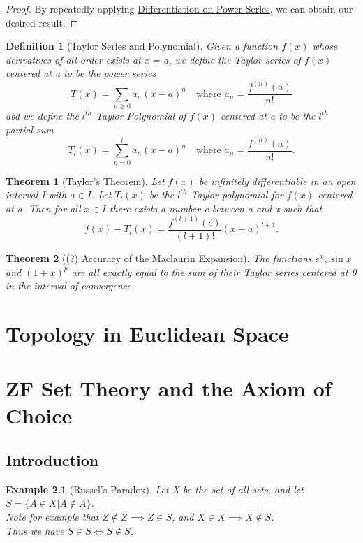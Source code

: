 \documentclass[11pt, oneside]{book}
\theoremstyle{break}
\newtheorem{thm}{Theorem}[section]
\newtheorem*{proof}{Proof}
\newtheorem{defn}{Definition}[section]
\newtheorem{eg}{Example}[section]
\begin{document}
\begin{proof}
	By repeatedly applying \hyperref[power_series_differentiation]{Differentiation on Power Series}, we can obtain our desired result.
\end{proof}

\begin{defn}[Taylor Series and Polynomial]
	Given a function $f(x)$ whose derivatives of all order exists at x = a, we define the Taylor series of $f(x)$ centered at a to be the power series
	\[
		T(x) = \sum_{n \geq 0} a_n (x-a)^n \quad \text{where } a_n = \frac{f^{(n)}(a)}{n!} 
	\]
	abd we define the $l^{th}$ Taylor Polynomial of $f(x)$ centered at a to be the $l^{th}$ partial sum
	\[
		T_l(x) = \sum_{n=0}^{l} a_n (x-a)^n \quad \text{where } a_n = \frac{f^{(n)}(a)}{n!}.
	\]
\end{defn}

\begin{thm}[Taylor's Theorem]
	Let $f(x)$ be infinitely differentiable in an open interval I with $a \in I$. Let $T_l(x)$ be the $l^{th}$ Taylor polynomial for $f(x)$ centered at a. Then for all $x \in I$ there exists a number c between a and x such that
	\[
		f(x) - T_l(x) = \frac{f^{(l + 1)}(c)}{(l + 1)!} (x-a)^{l+1}. 
	\]
\end{thm}

\begin{thm}[(?) Accuracy of the Maclaurin Expansion]
	The functions $e^x, \sin x$ and $(1+x)^p$ are all exactly equal to the sum of their Taylor series centered at 0 in the interval of convergence.
\end{thm}

\chapter{Topology in Euclidean Space}


\appendix

\chapter{ZF Set Theory and the Axiom of Choice}\label{apdxA}
\section{Introduction}
\begin{eg}[Russel's Paradox]\label{russel_paradox}
	Let X be the set of all sets, and let $S = \{ A \in X | A \notin A\}$.\\
	Note for example that $Z \notin Z \implies Z \in S$, and $X \in X \implies X \notin S$.\\
	Thus we have $S \in S \iff S \notin S$.
\end{eg}
\end{document}

